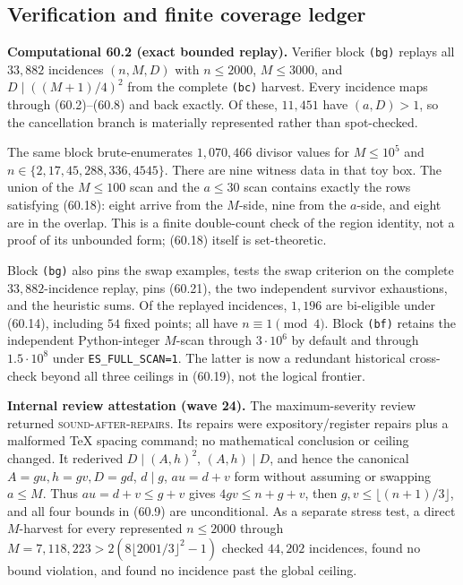 \documentclass[10pt,reqno]{amsart}
\theoremstyle{definition}
\newcommand{\1}{\mathbf 1}
\begin{document}
\subsection{Verification and finite coverage ledger}
\medskip\noindent\textbf{Computational 60.2 (exact bounded replay).}
Verifier block \texttt{(bg)} replays all $33{,}882$ incidences $(n,M,D)$
with $n\leq2000$, $M\leq3000$, and $D\mid((M+1)/4)^2$ from the complete
\texttt{(bc)} harvest.  Every incidence maps through (60.2)--(60.8) and
back exactly.  Of these, $11{,}451$ have $(a,D)>1$, so the cancellation
branch is materially represented rather than spot-checked.

The same block brute-enumerates $1{,}070{,}466$ divisor values for
$M\leq10^5$ and $n\in\{2,17,45,288,336,4545\}$.  There are nine witness
data in that toy box.  The union of the $M\leq100$ scan and the $a\leq30$
scan contains exactly the rows satisfying (60.18): eight arrive from the
$M$-side, nine from the $a$-side, and eight are in the overlap.  This is a
finite double-count check of the region identity, not a proof of its
unbounded form; (60.18) itself is set-theoretic.

Block \texttt{(bg)} also pins the swap examples, tests the swap criterion on
the complete $33{,}882$-incidence replay, pins (60.21), the two independent
survivor exhaustions, and the heuristic sums.  Of the replayed incidences,
$1{,}196$ are bi-eligible under (60.14), including $54$ fixed points; all
have $n\equiv1\pmod4$.  Block \texttt{(bf)} retains the independent
Python-integer $M$-scan through $3\cdot10^6$ by default and through
$1.5\cdot10^8$ under \texttt{ES\_FULL\_SCAN=1}.  The latter is now a
redundant historical cross-check beyond all three ceilings in (60.19), not
the logical frontier.

\medskip\noindent\textbf{Internal review attestation (wave 24).}
The maximum-severity review returned \textsc{sound-after-repairs}.  Its
repairs were expository/register repairs plus a malformed TeX spacing
command; no mathematical conclusion or ceiling changed.  It rederived $D\mid(A,h)^2$, $(A,h)\mid D$, and hence the canonical
$A=gu,h=gv,D=gd$, $d\mid g$, $au=d+v$ form without assuming or swapping
$a\leq M$.  Thus $au=d+v\leq g+v$ gives $4gv\leq n+g+v$, then
$g,v\leq\lfloor(n+1)/3\rfloor$, and all four bounds in (60.9) are
unconditional.  As a separate stress test, a direct $M$-harvest for every
represented $n\leq2000$ through
$M=7{,}118{,}223>2(8\lfloor2001/3\rfloor^2-1)$ checked $44{,}202$
incidences, found no bound violation, and found no incidence past the
global ceiling.
\end{document}
